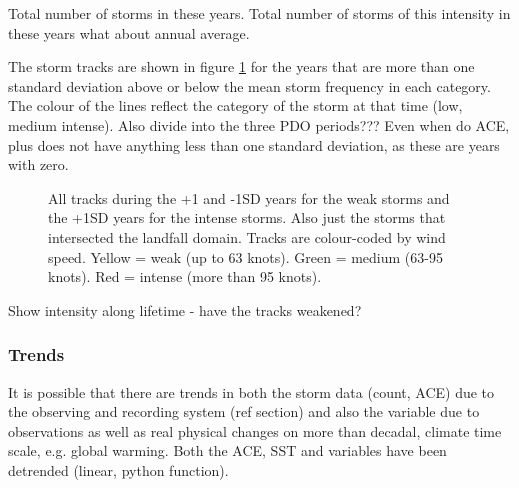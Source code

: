 Total number of storms in these years. Total number of storms of this intensity in these years
what about annual average.

The storm tracks are shown in figure \ref{fig:tracks} for the years that are more than one standard deviation above or below the mean storm frequency in each category. The colour of the lines reflect the category of the storm at that time (low, medium intense). Also divide into the three PDO periods???
Even when do ACE, plus does not have anything less than one standard deviation, as these are years with zero.
%
\begin{figure} %
	
	\caption{All tracks during the +1 and -1SD years for the weak storms and the +1SD years for the intense storms. Also just the storms that intersected the landfall domain. Tracks are colour-coded by wind speed. Yellow = weak (up to 63 knots). Green = medium (63-95 knots). Red = intense (more than 95 knots).}\label{fig:tracks}
\end{figure}

Show intensity along lifetime - have the tracks weakened?



\subsubsection{Trends}

It is possible that there are trends in both the storm data (count, ACE) due to the observing and recording system (ref section) and also the variable due to observations as well as real physical changes on more than decadal, climate time scale, e.g. global warming. Both the ACE, SST and variables have been detrended (linear, python function).


